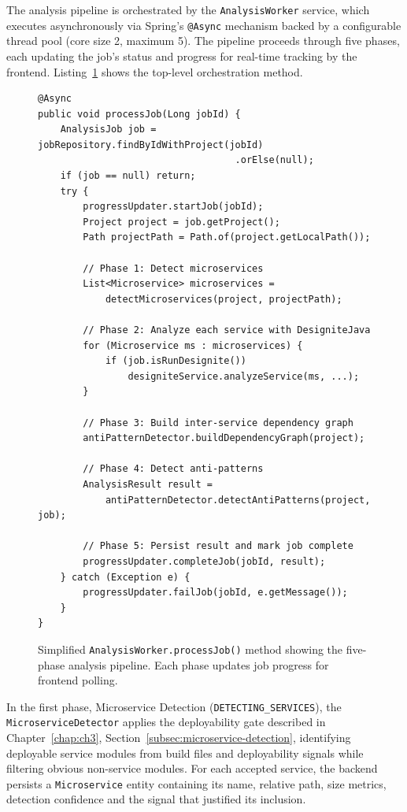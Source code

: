  \par The analysis pipeline is orchestrated by the \texttt{AnalysisWorker} service, which executes asynchronously via Spring's \texttt{@Async} mechanism backed by a configurable thread pool (core size 2, maximum 5). The pipeline proceeds through five phases, each updating the job's status and progress for real-time tracking by the frontend. Listing~\ref{lst:analysis-worker} shows the top-level orchestration method.

\begin{figure}[htbp]
    \begin{verbatim}
@Async
public void processJob(Long jobId) {
    AnalysisJob job = jobRepository.findByIdWithProject(jobId)
                                   .orElse(null);
    if (job == null) return;
    try {
        progressUpdater.startJob(jobId);
        Project project = job.getProject();
        Path projectPath = Path.of(project.getLocalPath());

        // Phase 1: Detect microservices
        List<Microservice> microservices =
            detectMicroservices(project, projectPath);

        // Phase 2: Analyze each service with DesigniteJava
        for (Microservice ms : microservices) {
            if (job.isRunDesignite())
                designiteService.analyzeService(ms, ...);
        }

        // Phase 3: Build inter-service dependency graph
        antiPatternDetector.buildDependencyGraph(project);

        // Phase 4: Detect anti-patterns
        AnalysisResult result =
            antiPatternDetector.detectAntiPatterns(project, job);

        // Phase 5: Persist result and mark job complete
        progressUpdater.completeJob(jobId, result);
    } catch (Exception e) {
        progressUpdater.failJob(jobId, e.getMessage());
    }
}
    \end{verbatim}
    \caption{Simplified \texttt{AnalysisWorker.processJob()} method showing the five-phase analysis pipeline. Each phase updates job progress for frontend polling.}
    \label{lst:analysis-worker}
\end{figure}


In the first phase, Microservice Detection (\texttt{DETECTING\_SERVICES}), the \texttt{Micro\-ser\-vice\-De\-tec\-tor} applies the deployability gate described in Chapter~\ref{chap:ch3}, Section~\ref{subsec:microservice-detection}, identifying deployable service modules from build files and deployability signals while filtering obvious non-service modules. For each accepted service, the backend persists a \texttt{Microservice} entity containing its name, relative path, size metrics, detection confidence and the signal that justified its inclusion.


